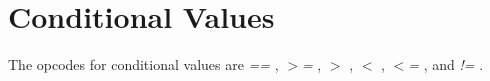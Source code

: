\begin{comment}
\documentclass[10pt]{article}
\usepackage{fullpage, graphicx, url}
\setlength{\parskip}{1ex}
\setlength{\parindent}{0ex}
\title{Conditional Values}



\begin{tabular}{ccc}
The Alternative Csound Reference Manual & & \\
Previous &Instrument Control &Next

\end{tabular}

\end{comment}
\section{Conditional Values}


  The opcodes for conditional values are \emph{==}
, \emph{$>$=}
, \emph{$>$}
, \emph{$<$}
, \emph{$<$=}
, and \emph{!=}
. 


\begin{comment}
\begin{tabular}{lcr}
Previous &Home &Next \\
Instrument Control &Up &Duration Control Statements

\end{tabular}



\end{comment}
